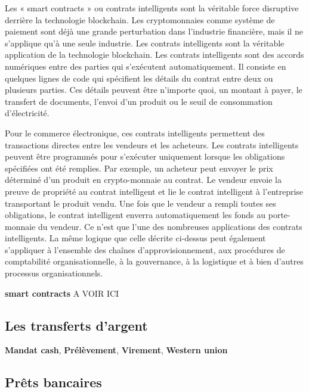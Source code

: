 \documentclass[12pt]{report}
\begin{document}
\hspace{1cm} 

Les « smart contracts » ou contrats intelligents sont la véritable force disruptive derrière la technologie blockchain. Les cryptomonnaies comme système de paiement sont déjà une grande perturbation dans l’industrie financière, mais il ne s’applique qu’à une seule industrie. Les contrats intelligents sont la véritable application de la technologie blockchain. Les contrats intelligents sont des accords numériques entre des parties qui s’exécutent automatiquement. Il consiste en quelques lignes de code qui spécifient les détails du contrat entre deux ou plusieurs parties. Ces détails peuvent être n’importe quoi, un montant à payer, le transfert de documents, l’envoi d’un produit ou le seuil de consommation d’électricité.

Pour le commerce électronique, ces contrats intelligents permettent des transactions directes entre les vendeurs et les acheteurs. Les contrats intelligents peuvent être programmés pour s’exécuter uniquement lorsque les obligations spécifiées ont été remplies. Par exemple, un acheteur peut envoyer le prix déterminé d’un produit en crypto-monnaie au contrat. Le vendeur envoie la preuve de propriété au contrat intelligent et lie le contrat intelligent à l’entreprise transportant le produit vendu. Une fois que le vendeur a rempli toutes ses obligations, le contrat intelligent enverra automatiquement les fonds au porte-monnaie du vendeur. Ce n’est que l’une des nombreuses applications des contrats intelligents. La même logique que celle décrite ci-dessus peut également s’appliquer à l’ensemble des chaînes d’approvisionnement, aux procédures de comptabilité organisationnelle, à la gouvernance, à la logistique et à bien d’autres processus organisationnels.

\textbf{smart contracts} A VOIR ICI


    \subsection{Les transferts d'argent}
\textbf{Mandat cash}, \textbf{Prélèvement}, \textbf{Virement}, \textbf{Western union}
\hspace{1cm}

    \subsection{Prêts bancaires}
\hspace{1cm}
\end{document}

